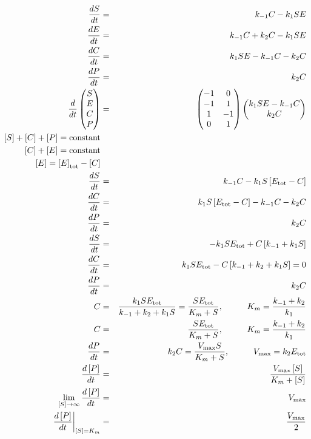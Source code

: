 \documentclass{article}
\begin{document}
\begin{eqnarray*}
\frac{dS}{dt} & = & k_{-1} C - k_1 S E\\
\frac{dE}{dt} & = & k_{-1} C + k_2 C - k_1 S E\\
\frac{dC}{dt} & = & k_1 S E - k_{-1} C - k_2 C\\
\frac{dP}{dt} & = & k_2 C\\
\frac{d}{dt} \begin{pmatrix} S\\ E\\ C\\ P \end{pmatrix} & = & \begin{pmatrix} -1 & 0\\ -1 & 1\\ 1 & -1\\ 0 & 1 \end{pmatrix}\begin{pmatrix} k_1 S E - k_{-1} C\\k_2C\end{pmatrix}\\
\left[ S \right] + \left[ C \right] + \left[ P \right] = \textrm{constant}\\
\left[ C \right] + \left[ E \right] = \textrm{constant}\\
 \left[ E \right] =   \left[ E \right]_{\textrm{tot}} - \left[ C \right] \\
 \frac{dS}{dt} & = & k_{-1} C - k_1 S \left[ E_{\textrm{tot}} - C \right]\\
\frac{dC}{dt} & = & k_1 S \left[ E_{\textrm{tot}} - C \right] - k_{-1} C - k_2 C\\
\frac{dP}{dt} & = & k_2 C\\
 \frac{dS}{dt} & = & - k_1 S E_{\textrm{tot}} + C \left[k_{-1} + k_1 S \right]\\
\frac{dC}{dt} & = & k_1 S E_{\textrm{tot}}  - C \left[ k_{-1} + k_2 + k_1 S \right] = 0 \\
\frac{dP}{dt} & = & k_2 C\\
C & = & \frac{k_1 S E_{\textrm{tot}}}{k_{-1} + k_2 + k_1 S} = \frac{S E_{\textrm{tot}}}{K_m + S}, \hspace{ 1 cm} K_m = \frac{k_{-1} + k_2}{k_1}\\
C & = & \frac{S E_{\textrm{tot}}}{K_m + S}, \hspace{ 1 cm} K_m = \frac{k_{-1} + k_2}{k_1}\\
\frac{dP}{dt} & = & k_2 C = \frac{V_{\textrm{max}} S}{K_m + S}, \hspace{1 cm} V_{\textrm{max}} = k_2 E_{\textrm{tot}}\\
\frac{d\left[ P \right]}{dt} & = &  \frac{V_{\textrm{max}} \left[S\right]}{K_m + \left[S \right]}\\
\lim_{[S] \to \infty} \frac{d\left[ P \right]}{dt} & = & V_{\textrm{max}}\\
\left. \frac{d\left[ P \right]}{dt} \right|_{[S] = K_m} & = & \frac{V_{\textrm{max}}}{2}
\end{eqnarray*}
\end{document}
